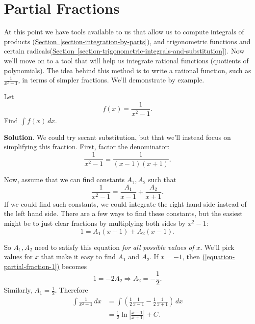\documentclass[10pt,]{book}
\theoremstyle{ptxplainnotitle}
\theoremstyle{ptxplaintitle}
\theoremstyle{ptxplainnotitle}
\theoremstyle{ptxplaintitle}
\theoremstyle{ptxplainnotitle}
\theoremstyle{ptxplaintitle}
\theoremstyle{ptxdefinitionnotitle}
\theoremstyle{ptxdefinitiontitle}
\theoremstyle{ptxdefinitionnotitle}
\theoremstyle{ptxdefinitiontitle}
\theoremstyle{ptxdefinitionnotitle}
\theoremstyle{ptxdefinitiontitle}
\theoremstyle{ptxdefinitionnotitle}
\theoremstyle{ptxdefinitiontitle}
\theoremstyle{ptxdefinitionnotitle}
\theoremstyle{ptxdefinitiontitle}
\numberwithin{equation}{section}
\begin{document}
\section[{Partial Fractions}]{Partial Fractions}\label{section-partial-fractions}
\hypertarget{p-549}{}%
At this point we have tools available to us that allow us to compute integrals of products (\hyperref[section-integration-by-parts]{Section~\ref{section-integration-by-parts}}), and trigonometric functions and certain radicals(\hyperref[section-trigonometric-integrals-and-substitution]{Section~\ref{section-trigonometric-integrals-and-substitution}}). Now we'll move on to a tool that will help us integrate rational functions (quotients of polynomials). The idea behind this method is to write a rational function, such as \(\frac{1}{x^{2} - 1}\), in terms of simpler fractions. We'll demonstrate by example.%
\begin{example}\label{example-integrating-a-rational-function}
\hypertarget{p-550}{}%
Let%
\begin{equation*}
f(x) = \frac{1}{x^{2} - 1}.
\end{equation*}
Find \(\int f(x)\,dx\).%
\par\smallskip%
\noindent\textbf{Solution}.\hypertarget{solution-121}{}\quad%
\hypertarget{p-551}{}%
We could try secant substitution, but that we'll instead focus on simplifying this fraction. First, factor the denominator:%
\begin{equation*}
\frac{1}{x^{2} - 1} = \frac{1}{(x-1)(x+1)}.
\end{equation*}
%
\par
\hypertarget{p-552}{}%
Now, assume that we can find constants \(A_{1}, A_{2}\) such that%
\begin{equation*}
\frac{1}{x^{2} - 1} = \frac{A_{1}}{x-1} + \frac{A_{2}}{x + 1}.
\end{equation*}
If we could find such constants, we could integrate the right hand side instead of the left hand side. There are a few ways to find these constants, but the easiest might be to just clear fractions by multiplying both sides by \(x^{2} - 1\):%
\begin{equation}
1 = A_{1}(x + 1) + A_{2}(x - 1).\label{equation-partial-fraction-1}
\end{equation}
%
\par
\hypertarget{p-553}{}%
So \(A_{1},A_{2}\) need to satisfy this equation \emph{for all possible values of} \(x\). We'll pick values for \(x\) that make it easy to find \(A_{1}\) and \(A_{2}\). If \(x = -1\), then \hyperref[equation-partial-fraction-1]{(\ref{equation-partial-fraction-1})} becomes%
\begin{equation*}
1 = -2A_{2} \Rightarrow A_{2} = -\frac{1}{2}.
\end{equation*}
Similarly, \(A_{1} = \frac{1}{2}.\) Therefore%
%
\begin{align*}
\int\frac{1}{x^{2}-1}\,dx & = \int\left(\frac{1}{2}\frac{1}{x-1} - \frac{1}{2}\frac{1}{x+1}\right)\,dx \\
& = \frac{1}{2}\ln\left|\frac{x-1}{x+1}\right| + C. 
\end{align*}
\end{example}
\end{document}
